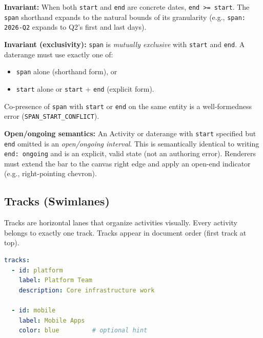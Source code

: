 \textbf{Invariant:} When both \texttt{start} and \texttt{end} are concrete dates,
\texttt{end >= start}. The \texttt{span} shorthand expands to the natural bounds of its
granularity (e.g., \texttt{span: 2026-Q2} expands to Q2's first and last days).

\textbf{Invariant (exclusivity):} \texttt{span} is \emph{mutually exclusive} with
\texttt{start} and \texttt{end}. A daterange must use exactly one of:
\begin{itemize}
  \item \texttt{span} alone (shorthand form), or
  \item \texttt{start} alone or \texttt{start} + \texttt{end} (explicit form).
\end{itemize}
Co-presence of \texttt{span} with \texttt{start} or \texttt{end} on the same entity is
a well-formedness error (\texttt{SPAN\_START\_CONFLICT}).

\textbf{Open/ongoing semantics:} An Activity or daterange with \texttt{start} specified
but \texttt{end} omitted is an \emph{open/ongoing interval}. This is semantically
identical to writing \texttt{end: ongoing} and is an explicit, valid state (not an
authoring error). Renderers must extend the bar to the canvas right edge and apply
an open-end indicator (e.g., right-pointing chevron).


\subsection{Tracks (Swimlanes)}
\label{sec:ir-tracks}

Tracks are horizontal lanes that organize activities visually. Every activity belongs to
exactly one track. Tracks appear in document order (first track at top).

\begin{lstlisting}[language=yaml,caption={Track examples}]
tracks:
  - id: platform
    label: Platform Team
    description: Core infrastructure work

  - id: mobile
    label: Mobile Apps
    color: blue         # optional hint
\end{lstlisting}

